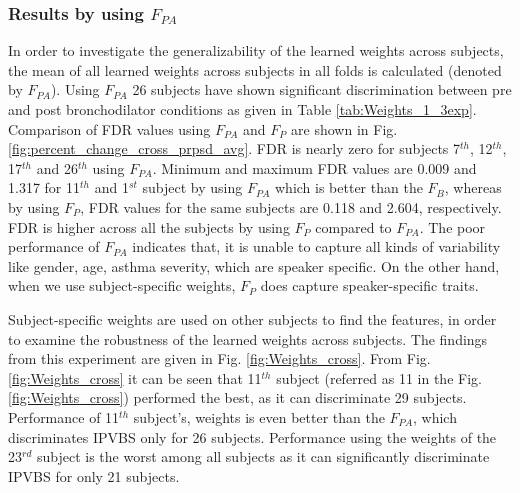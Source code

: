 \documentclass{article}
\begin{document}


\subsubsection{Results by using $F_{PA}$}

In order to investigate the generalizability of the learned weights across subjects, the mean of all learned weights across subjects in all folds is calculated (denoted by $F_{PA}$). Using $F_{PA}$ 26 subjects have shown significant discrimination between pre and post bronchodilator conditions as given in Table \ref{tab:Weights_1_3exp}. Comparison of FDR values using $F_{PA}$ and $F_{P}$ are shown in Fig. \ref{fig:percent_change_cross_prpsd_avg}. FDR is nearly zero for subjects 7$^{th}$, 12$^{th}$, 17$^{th}$ and 26$^{th}$ using $F_{PA}$. Minimum and maximum FDR values are 0.009 and 1.317 for 11$^{th}$ and 1$^{st}$ subject by using $F_{PA}$ which is better than the $F_B$, whereas by using $F_{P}$, FDR values for the same subjects are 0.118 and 2.604, respectively. FDR is higher across all the subjects by using $F_{P}$ compared to $F_{PA}$.
The poor performance of $F_{PA}$ indicates that, it is unable to capture all kinds of variability like gender, age, asthma severity, which are speaker specific. On the other hand, when we use subject-specific weights, $F_{P}$ does capture speaker-specific traits. 


Subject-specific weights are used on other subjects to find the features, in order to examine the robustness of the learned weights across subjects. The findings from this experiment are given in Fig. \ref{fig:Weights_cross}. From Fig. \ref{fig:Weights_cross} it can be seen that 11$^{th}$ subject (referred as 11 in the Fig. \ref{fig:Weights_cross}) performed the best, as it can discriminate 29 subjects.
Performance of 11$^{th}$ subject's, weights is even better than the $F_{PA}$, which discriminates IPVBS only for 26 subjects. Performance using the weights of the 23$^{rd}$ subject is the worst among all subjects as it can significantly discriminate IPVBS for only 21 subjects.
\end{document}
